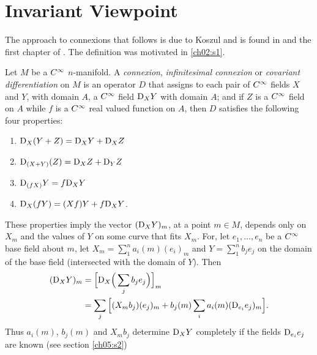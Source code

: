 \documentclass[../main]{subfiles}
\begin{document}
\section{Invariant Viewpoint}\label{ch05:s1}
The approach to connexions that follows is due to Koszul and is found in \cite{nomizu1954invariant}
and the first chapter of \cite{helgason2012differential}. The definition was motivated in \ref{ch02:s1}.

Let $M$ be a $C^\infty$ $n$-manifold. A \emph{connexion}, \emph{infinitesimal connexion} or \emph{covariant differentiation} on $M$ is an operator $D$ that assigns to each pair of $C^\infty$ fields $X$ and $Y$, with domain $A$, a $C^\infty$ field $\mathrm{D}_X Y$ with domain $A$; and if $Z$ is a $C^\infty$ field on $A$ while $f$ is a $C^\infty$ real valued function on $A$, then $D$ satisfies the following four properties:
\begin{enumerate}[label=(\arabic*)]

    
    \item\label{eqn:ch5.1.1} $\mathrm{D}_X(Y+Z) = \mathrm{D}_X Y + \mathrm{D}_X Z$
    
    \item\label{eqn:ch5.1.2} $\mathrm{D}_{(X+Y)}(Z) = \mathrm{D}_X Z + \mathrm{D}_Y Z$
    
    \item\label{eqn:ch5.1.3} $\mathrm{D}_{(fX)} Y = f \mathrm{D}_X Y$
    
    \item\label{eqn:ch5.1.4} $\mathrm{D}_X(fY) = (Xf)Y + f\mathrm{D}_X Y$.
    
\end{enumerate}
These properties imply the vector $(\mathrm{D}_X Y)_m$, at a point $m \in M$, depends only on $X_m$ and the values of $Y$ on some curve that fits $X_m$. For, let $e_1,\dots,e_n$ be a $C^\infty$ base field about $m$, let $X_m = \displaystyle\sum_1^n a_i(m)(e_i)_m$ and $Y = \displaystyle\sum_1^n b_j e_j$ on the domain of the base field (intersected with the domain of $Y$). Then
\begin{align*}
    (\mathrm{D}_X Y)_m &= \Big[\mathrm{D}_X\Big(\sum_j b_j e_j\Big)\Big]_m \\
    &= \sum_j \Big[(X_m b_j)(e_j)_m + b_j(m)\sum_i a_i(m)(\mathrm{D}_{e_i}e_j)_m\Big].
\end{align*}
Thus $a_i(m)$, $b_j(m)$ and $X_m b_j$ determine $\mathrm{D}_X Y$ completely if the fields $\mathrm{D}_{e_i}e_j$ are known (see section \ref{ch05:s2})
\end{document}
